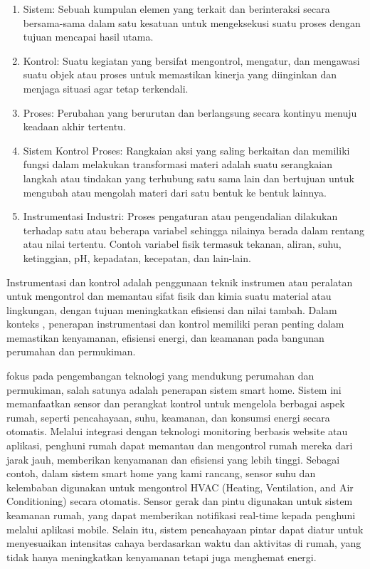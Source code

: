 \begin{enumerate}[label=\alph*]
    \item Sistem: Sebuah kumpulan elemen yang terkait dan berinteraksi secara bersama-sama dalam satu kesatuan untuk mengeksekusi suatu proses dengan tujuan mencapai hasil utama.

    \item Kontrol: Suatu kegiatan yang bersifat mengontrol, mengatur, dan mengawasi suatu objek atau proses untuk memastikan kinerja yang diinginkan dan menjaga situasi agar tetap terkendali.

    \item Proses: Perubahan yang berurutan dan berlangsung secara kontinyu menuju keadaan akhir tertentu.

    \item Sistem Kontrol Proses: Rangkaian aksi yang saling berkaitan dan memiliki fungsi dalam melakukan transformasi materi adalah suatu serangkaian langkah atau tindakan yang terhubung satu sama lain dan bertujuan untuk mengubah atau mengolah materi dari satu bentuk ke bentuk lainnya.

    \item Instrumentasi Industri: Proses pengaturan atau pengendalian dilakukan terhadap satu atau beberapa variabel sehingga nilainya berada dalam rentang atau nilai tertentu. Contoh variabel fisik termasuk tekanan, aliran, suhu, ketinggian, pH, kepadatan, kecepatan, dan lain-lain.
    
\end{enumerate}

Instrumentasi dan kontrol adalah penggunaan teknik instrumen atau peralatan untuk mengontrol dan memantau sifat fisik dan kimia suatu material atau lingkungan, dengan tujuan meningkatkan efisiensi dan nilai tambah. Dalam konteks {\perusahaan}, penerapan instrumentasi dan kontrol memiliki peran penting dalam memastikan kenyamanan, efisiensi energi, dan keamanan pada bangunan perumahan dan permukiman. 

{\perusahaan} fokus pada pengembangan teknologi yang mendukung perumahan dan permukiman, salah satunya adalah penerapan sistem smart home. Sistem ini memanfaatkan sensor dan perangkat kontrol untuk mengelola berbagai aspek rumah, seperti pencahayaan, suhu, keamanan, dan konsumsi energi secara otomatis. Melalui integrasi dengan teknologi monitoring berbasis website atau aplikasi, penghuni rumah dapat memantau dan mengontrol rumah mereka dari jarak jauh, memberikan kenyamanan dan efisiensi yang lebih tinggi. Sebagai contoh, dalam sistem smart home yang kami rancang, sensor suhu dan kelembaban digunakan untuk mengontrol HVAC (Heating, Ventilation, and Air Conditioning) secara otomatis. Sensor gerak dan pintu digunakan untuk sistem keamanan rumah, yang dapat memberikan notifikasi real-time kepada penghuni melalui aplikasi mobile. Selain itu, sistem pencahayaan pintar dapat diatur untuk menyesuaikan intensitas cahaya berdasarkan waktu dan aktivitas di rumah, yang tidak hanya meningkatkan kenyamanan tetapi juga menghemat energi. 

